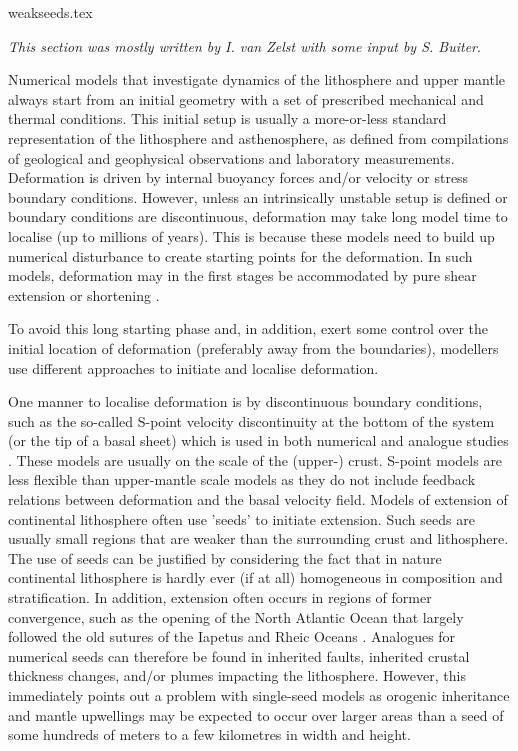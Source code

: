 \begin{flushright} {\tiny {\color{gray} weakseeds.tex}} \end{flushright}

{\sl This section was mostly written by I. van Zelst with some input by S. Buiter}. 

Numerical models that investigate dynamics of the lithosphere and upper mantle always
start from an initial geometry with a set of prescribed mechanical and thermal conditions. 
This initial setup is usually a more-or-less standard representation of the
lithosphere and asthenosphere, as defined from compilations of geological and geophysical 
observations and laboratory measurements. Deformation is driven by internal buoyancy
forces and/or velocity or stress boundary conditions. However, unless an 
intrinsically unstable setup is defined or boundary conditions are discontinuous, 
deformation may take long model time to localise (up to millions of years). 
This is because these models need to build up numerical disturbance to create starting 
points for the deformation. In such models, deformation may in the first stages be
accommodated by pure shear extension or shortening \cite{pybf00,moql07}. 

To avoid this long starting phase and, in addition, exert some control 
over the initial location of deformation (preferably away from the boundaries), modellers 
use different approaches to initiate and localise deformation.

One manner to localise deformation is by discontinuous boundary conditions, such 
as the so-called S-point velocity discontinuity at the bottom of the system 
(or the tip of a basal sheet) which is used in both numerical 
\cite{brbe95,elfb95,will99a,bemh00,bube06,thfb08,brya10}
and analogue studies \cite{bube06,mime00}.
These models are usually on the scale of the (upper-) crust. 
S-point models are less flexible than upper-mantle scale models as they do not include
feedback relations between deformation and the basal velocity field.
Models of extension of continental lithosphere often use 'seeds' to initiate
extension. Such seeds are usually small regions that are weaker than the surrounding crust
and lithosphere. The use of seeds can be justified by considering the fact that in
nature continental lithosphere is hardly ever (if at all) homogeneous in composition 
and stratification. In addition, extension often occurs in regions of former
convergence, such as the opening of the North Atlantic Ocean that largely followed the old 
sutures of the Iapetus and Rheic Oceans \cite{wils66}. Analogues for numerical seeds 
can therefore be found in inherited faults, inherited crustal thickness changes, and/or 
plumes impacting the lithosphere. However, this immediately points out a problem with 
single-seed models as orogenic inheritance and mantle upwellings may be expected to 
occur over larger areas than a seed of some hundreds of meters to a few kilometres 
in width and height.

